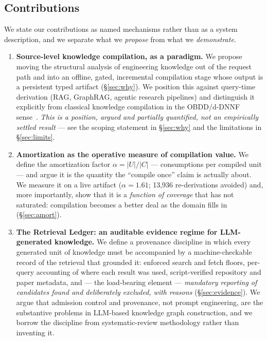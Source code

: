\documentclass[10pt,a4paper]{article}
\begin{document}
\subsection{Contributions}

We state our contributions as named mechanisms rather than as a system
description, and we separate what we \emph{propose} from what we
\emph{demonstrate}.

\begin{enumerate}[leftmargin=1.6em,itemsep=4pt]

\item \textbf{Source-level knowledge compilation, as a paradigm.} We propose
  moving the structural analysis of engineering knowledge out of the request path
  and into an offline, gated, incremental compilation stage whose output is a
  persistent typed artifact (\S\ref{sec:why}). We position this against
  query-time derivation (RAG, GraphRAG, agentic research pipelines) and
  distinguish it explicitly from classical knowledge compilation in the
  OBDD/d-DNNF sense~\cite{darwiche2002kcmap}. \emph{This is a position, argued
  and partially quantified, not an empirically settled result} --- see the
  scoping statement in \S\ref{sec:why} and the limitations in
  \S\ref{sec:limits}.

\item \textbf{Amortization as the operative measure of compilation value.} We
  define the amortization factor $\alpha = |U|/|C|$ --- consumptions per compiled
  unit --- and argue it is the quantity the ``compile once'' claim is actually
  about. We measure it on a live artifact ($\alpha = 1.61$; 13{,}936 re-derivations
  avoided) and, more importantly, show that it is a \emph{function of coverage}
  that has not saturated: compilation becomes a better deal as the domain fills
  in (\S\ref{sec:amort}).

\item \textbf{The Retrieval Ledger: an auditable evidence regime for
  LLM-generated knowledge.} We define a provenance discipline in which every
  generated unit of knowledge must be accompanied by a machine-checkable record
  of the retrieval that grounded it: enforced search and fetch floors, per-query
  accounting of where each result was used, script-verified repository and paper
  metadata, and --- the load-bearing element --- \emph{mandatory reporting of
  candidates found and deliberately excluded, with reasons}
  (\S\ref{sec:evidence}). We argue that admission control and provenance, not
  prompt engineering, are the substantive problems in LLM-based knowledge graph
  construction, and we borrow the discipline from systematic-review methodology
  rather than inventing it.


\end{enumerate}
\end{document}
